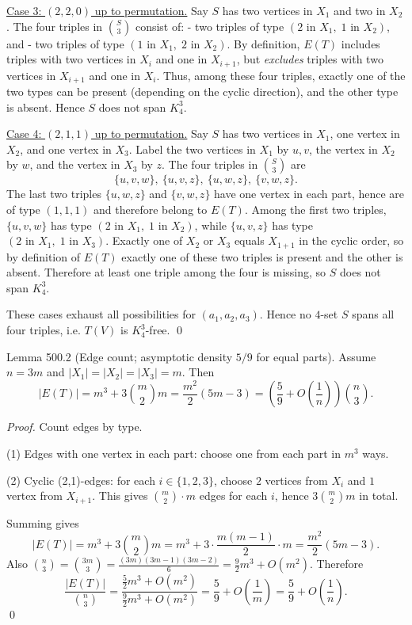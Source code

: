 \underline{Case 3: $(2,2,0)$ up to permutation.}
Say $S$ has two vertices in $X_1$ and two in $X_2$. The four triples in $\binom{S}{3}$ consist of:
- two triples of type $(2\text{ in }X_1,\;1\text{ in }X_2)$, and
- two triples of type $(1\text{ in }X_1,\;2\text{ in }X_2)$.
By definition, $E(T)$ includes triples with two vertices in $X_i$ and one in $X_{i+1}$, but \emph{excludes} triples with two vertices in $X_{i+1}$ and one in $X_i$.
Thus, among these four triples, exactly one of the two types can be present (depending on the cyclic direction), and the other type is absent. Hence $S$ does not span $K_4^3$.

\underline{Case 4: $(2,1,1)$ up to permutation.}
Say $S$ has two vertices in $X_1$, one vertex in $X_2$, and one vertex in $X_3$.
Label the two vertices in $X_1$ by $u,v$, the vertex in $X_2$ by $w$, and the vertex in $X_3$ by $z$.
The four triples in $\binom{S}{3}$ are
\[\{u,v,w\},\ \{u,v,z\},\ \{u,w,z\},\ \{v,w,z\}.
\]
The last two triples $\{u,w,z\}$ and $\{v,w,z\}$ have one vertex in each part, hence are of type $(1,1,1)$ and therefore belong to $E(T)$.
Among the first two triples, $\{u,v,w\}$ has type $(2\text{ in }X_1,\;1\text{ in }X_2)$, while $\{u,v,z\}$ has type $(2\text{ in }X_1,\;1\text{ in }X_3)$.
Exactly one of $X_2$ or $X_3$ equals $X_{1+1}$ in the cyclic order, so by definition of $E(T)$ exactly one of these two triples is present and the other is absent. Therefore at least one triple among the four is missing, so $S$ does not span $K_4^3$.

These cases exhaust all possibilities for $(a_1,a_2,a_3)$. Hence no $4$-set $S$ spans all four triples, i.e. $T(V)$ is $K_4^3$-free. \qed

Lemma 500.2 (Edge count; asymptotic density $5/9$ for equal parts).
Assume $n=3m$ and $\lvert X_1\rvert=\lvert X_2\rvert=\lvert X_3\rvert=m$. Then
\[
\lvert E(T)\rvert 
= m^3 + 3\binom{m}{2}m
= \frac{m^2}{2}(5m-3)
= \left(\frac{5}{9}+O\left(\frac{1}{n}\right)\right)\binom{n}{3}.
\]

\emph{Proof.}
Count edges by type.

(1) Edges with one vertex in each part: choose one from each part in $m^3$ ways.

(2) Cyclic (2,1)-edges: for each $i\in\{1,2,3\}$, choose $2$ vertices from $X_i$ and $1$ vertex from $X_{i+1}$. This gives $\binom{m}{2}\cdot m$ edges for each $i$, hence $3\binom{m}{2}m$ in total.

Summing gives
\[
\lvert E(T)\rvert = m^3 + 3\binom{m}{2}m = m^3 + 3\cdot \frac{m(m-1)}{2}\cdot m = \frac{m^2}{2}(5m-3).
\]
Also $\binom{n}{3}=\binom{3m}{3} = \frac{(3m)(3m-1)(3m-2)}{6} = \frac{9}{2}m^3 + O(m^2)$.
Therefore
\[
\frac{\lvert E(T)\rvert}{\binom{n}{3}}
= \frac{\frac{5}{2}m^3 + O(m^2)}{\frac{9}{2}m^3 + O(m^2)}
= \frac{5}{9} + O\left(\frac{1}{m}\right)
= \frac{5}{9} + O\left(\frac{1}{n}\right).
\]
\qed

